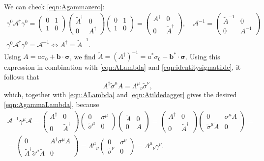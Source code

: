 \documentclass[a4paper,12pt]{book}
\renewcommand{\vec}{\mathbf}
\theoremstyle{definition}
\theoremstyle{remark}
\let\oldcdot\cdot
\renewcommand{\cdot}{\! \oldcdot \!}
\begin{document}
We can check \cref{eqn:Agammazero}:
\begin{gather}
\gamma^0\mathcal A^\dagger\gamma^0=
\begin{pmatrix}0&1\\ 1&0\end{pmatrix}
\begin{pmatrix}\tilde A^\dagger&0\\ 0&A^\dagger\end{pmatrix}
\begin{pmatrix}0&1\\ 1&0\end{pmatrix}=
\begin{pmatrix} A^\dagger&0\\ 0&\tilde A^\dagger\end{pmatrix},
\quad\mathcal A^{-1}=\begin{pmatrix}\tilde A^{-1}&0\\ 0&A^{-1}\end{pmatrix}\nonumber\\
\gamma^0\mathcal A^\dagger\gamma^0=\mathcal A^{-1}\iff A^\dagger=\tilde A^{-1}.
\label{eqn:Atildedagger}
\end{gather}
Using $A=a\sigma_0+\vec b\cdot\boldsymbol\sigma$, we find $\tilde A=(A^\dagger)^{-1}=a^*\sigma_0-\vec b^*\cdot\boldsymbol\sigma$. Using this expression in combination with \cref{eqn:ALambda} and \cref{eqn:identitysigmatilde}, it follows that
\[A^\dagger\tilde\sigma^\mu A=\Lambda^\mu{}_\nu\tilde\sigma^\nu,\]
which, together with \cref{eqn:ALambda} and \cref{eqn:Atildedagger} gives the desired \cref{eqn:AgammaLambda}, because
\begin{multline*}
\mathcal A^{-1}\gamma^\mu\mathcal A=
\begin{pmatrix}A^\dagger&0\\ 0&\tilde A^\dagger\end{pmatrix}
\begin{pmatrix}0&\sigma^\mu\\ \tilde\sigma^\mu&0\end{pmatrix}
\begin{pmatrix}\tilde A&0\\ 0&A\end{pmatrix}=
\begin{pmatrix}A^\dagger&0\\ 0&\tilde A^\dagger\end{pmatrix}
\begin{pmatrix}0&\sigma^\mu A\\ \tilde\sigma^\mu \tilde A&0\end{pmatrix}=\\
=\begin{pmatrix}0&A^\dagger\sigma^\mu A\\ \tilde A^\dagger\tilde\sigma^\mu\tilde A&0\end{pmatrix}=
\Lambda^\mu{}_\nu\begin{pmatrix}0&\sigma^\nu\\ \tilde\sigma^\nu&0\end{pmatrix}=\Lambda^\mu{}_\nu\gamma^\nu.
\end{multline*}
\end{document}
